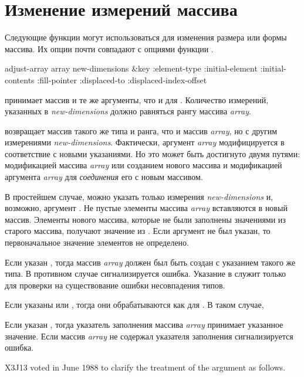 \section{Изменение измерений массива}

Следующие функции могут использоваться для изменения размера или формы массива.
Их опции почти совпадают с опциями функции .

\begin{defun}[Функция]
adjust-array array new-dimensions &key :element-type :initial-element :initial-contents :fill-pointer :displaced-to :displaced-index-offset

 принимает массив и те же аргументы, что и для
. Количество измерений, указанных в \emph{new-dimensions} должно
равняться рангу массива \emph{array}.

 возвращает массив такого же типа и ранга, что и массив
\emph{array}, но с другим измерениями \emph{new-dimensions}. Фактически, аргумент
\emph{array} модифицируется в соответствие с новыми указаниями. Но это может быть
достигнуто двумя путями: модификацией массива \emph{array} или созданием нового
массива и модификацией аргумента \emph{array} для \emph{соединения} его с новым
массивом.

В простейшем случае, можно указать только измерения \emph{new-dimensions} и,
возможно, аргумент .
Не пустые элементы массива \emph{array} вставляются в новый массив. Элементы
нового массива, которые не были заполнены значениями из старого массива,
получают значение из . Если аргумент не был указан, то
первоначальное значение элементов не определено.

Если указан , тогда массив \emph{array} должен был быть создан
с указанием такого же типа. В противном случае сигнализируется ошибка.
Указание  в  служит только для проверки на
существование ошибки несовпадения типов.

Если указаны  или , тогда они
обрабатываются как для . В таком случае, 

Если указан , тогда указатель заполнения массива \emph{array}
принимает указанное значение. Если массив \emph{array} не содержал указателя
заполнения сигнализируется ошибка.

\begin{new}
X3J13 voted in June 1988
to clarify the treatment of the 
argument as follows.


\end{new}
\end{defun}
